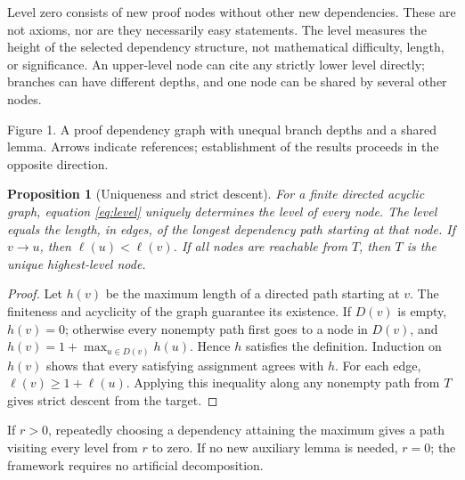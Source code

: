 \documentclass[11pt,a4paper]{article}
\newtheorem{proposition}{Proposition}
\theoremstyle{definition}\newtheorem{definition}{Definition}
\newcommand{\K}{\mathcal K}
\begin{document}
Level zero consists of new proof nodes without other new dependencies. These are not axioms, nor are they necessarily easy statements. The level measures the height of the selected dependency structure, not mathematical difficulty, length, or significance. An upper-level node can cite any strictly lower level directly; branches can have different depths, and one node can be shared by several other nodes.

\begin{center}
\par\small Figure 1. A proof dependency graph with unequal branch depths and a shared lemma. Arrows indicate references; establishment of the results proceeds in the opposite direction.
\end{center}

\begin{proposition}[Uniqueness and strict descent]\label{prop:height}
For a finite directed acyclic graph, equation \eqref{eq:level} uniquely determines the level of every node. The level equals the length, in edges, of the longest dependency path starting at that node. If $v\to u$, then $\ell(u)<\ell(v)$. If all nodes are reachable from $T$, then $T$ is the unique highest-level node.
\end{proposition}
\begin{proof}
Let $h(v)$ be the maximum length of a directed path starting at $v$. The finiteness and acyclicity of the graph guarantee its existence. If $D(v)$ is empty, $h(v)=0$; otherwise every nonempty path first goes to a node in $D(v)$, and $h(v)=1+\max_{u\in D(v)}h(u)$. Hence $h$ satisfies the definition. Induction on $h(v)$ shows that every satisfying assignment agrees with $h$. For each edge, $\ell(v)\ge 1+\ell(u)$. Applying this inequality along any nonempty path from $T$ gives strict descent from the target.
\end{proof}
If $r>0$, repeatedly choosing a dependency attaining the maximum gives a path visiting every level from $r$ to zero. If no new auxiliary lemma is needed, $r=0$; the framework requires no artificial decomposition.
\end{document}
